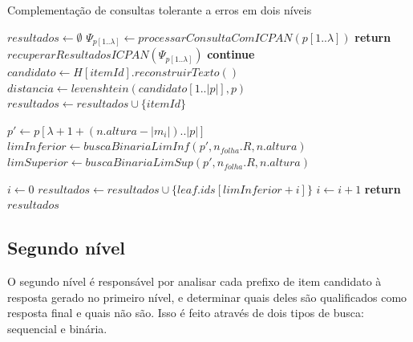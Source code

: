 \begin{algorithm}[ht]
\caption{Complementação de consultas tolerante a erros em dois níveis}\label{euclid}
\label{alg:2-level}
\begin{algorithmic}[1]
    \State $resultados \gets \emptyset$
    \State $\Psi_{p[1..\lambda]} \gets processarConsultaComICPAN(p[1..\lambda])$  
        \State \textbf{return} $recuperarResultadosICPAN(\Psi_{p[1..\lambda]})$
    \EndIf
                        \State \textbf{continue}
                    \EndIf
                    \State $candidato \gets H[itemId].reconstruirTexto()$
                    \State $distancia \gets levenshtein(candidato[1..|p|], p)$ 
                        \State $resultados \gets resultados \cup \{ itemId \}$
                    \EndIf
                    
                \EndFor
            \EndFor
        \Else
                \State $p' \gets p[\lambda+1+ (n.altura - |m_{i}|)..|p|]$
                \State $limInferior \gets buscaBinariaLimInf(p', n_{folha}.R, n.altura)$
                \State $limSuperior \gets buscaBinariaLimSup(p', n_{folha}.R, n.altura)$
                
                    \State $i \gets 0$
                        \State $resultados \gets resultados \cup \{ leaf.ids[limInferior + i] \} $
                        \State $i \gets i + 1$
                    \EndWhile
                \EndIf
            \EndFor
        \EndIf
    \EndFor
    \State \textbf{return} $resultados$ 
\EndFunction
\end{algorithmic}
\end{algorithm}

\subsection{Segundo nível}
\label{sec:second_level}

O segundo nível é responsável por analisar cada prefixo de item candidato à resposta gerado no primeiro nível, e determinar quais deles são qualificados como resposta final e quais não são. Isso é feito através de dois tipos de busca: sequencial e binária. 

